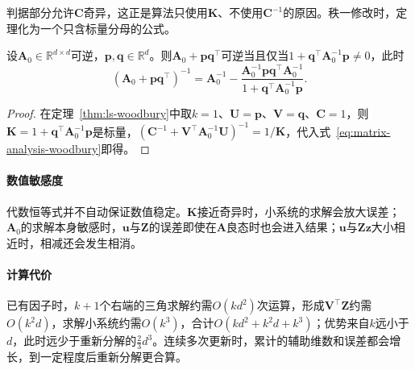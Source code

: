 判据部分允许$\bm C$奇异，这正是算法只使用$\bm K$、不使用$\bm C^{-1}$的原因。秩一修改时，定理化为一个只含标量分母的公式。

\begin{theorem}
\label{thm:ls-sherman-morrison}
设$\bm A_0\in\mathbb R^{d\times d}$可逆，$\bm p,\bm q\in\mathbb R^d$。则$\bm A_0+\bm p\bm q^\top$可逆当且仅当$1+\bm q^\top\bm A_0^{-1}\bm p\neq0$，此时
\begin{equation}
 (\bm A_0+\bm p\bm q^\top)^{-1}
 =\bm A_0^{-1}-\frac{\bm A_0^{-1}\bm p\bm q^\top\bm A_0^{-1}}{1+\bm q^\top\bm A_0^{-1}\bm p}.
 \label{eq:matrix-analysis-sherman-morrison}
\end{equation}
\end{theorem}
\begin{proof}
在定理~\ref{thm:ls-woodbury}中取$k=1$、$\bm U=\bm p$、$\bm V=\bm q$、$\bm C=1$，则$\bm K=1+\bm q^\top\bm A_0^{-1}\bm p$是标量，$(\bm C^{-1}+\bm V^\top\bm A_0^{-1}\bm U)^{-1}=1/\bm K$，代入式~\eqref{eq:matrix-analysis-woodbury}即得。
\end{proof}

\paragraph{数值敏感度}
代数恒等式并不自动保证数值稳定。$\bm K$接近奇异时，小系统的求解会放大误差；$\bm A_0$的求解本身敏感时，$\bm u$与$\bm Z$的误差即使在$\bm A$良态时也会进入结果；$\bm u$与$\bm Z\bm z$大小相近时，相减还会发生相消。

\paragraph{计算代价}
已有因子时，$k+1$个右端的三角求解约需$O(kd^2)$次运算，形成$\bm V^\top\bm Z$约需$O(k^2d)$，求解小系统约需$O(k^3)$，合计$O(kd^2+k^2d+k^3)$；优势来自$k$远小于$d$，此时远少于重新分解的$\tfrac23d^3$。连续多次更新时，累计的辅助维数和误差都会增长，到一定程度后重新分解更合算。
